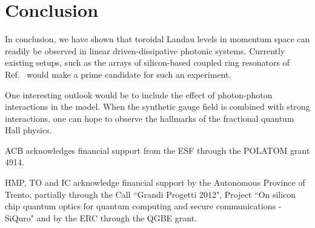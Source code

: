\documentclass[twocolumn, 10pt, aps, superscriptaddress, floatfix, showpacs, pra, citeautoscript]{revtex4-1}
\newcommand{\co}[2]{#2}
\renewcommand{\paragraph}{\co}
\begin{document}
\section{Conclusion}
\label{sec:conclusion}


In conclusion, we have shown that toroidal Landau levels in momentum
space can readily be observed in linear driven-dissipative photonic
systems. Currently existing setups, such as the arrays of
silicon-based coupled ring resonators of
Ref.~ would make a prime candidate for
such an experiment.

\paragraph{One possible outlook is to include interactions.}
One interesting outlook would be to include the effect of photon-photon interactions in the model. When the synthetic gauge field is combined with strong interactions, one can hope to observe the hallmarks of the fractional quantum Hall physics.


\acknowledgments

ACB acknowledges financial support from the ESF through the POLATOM grant 4914.

HMP, TO and IC acknowledge financial support by the Autonomous Province of Trento, partially through the Call ``Grandi Progetti 2012", Project ``On silicon chip quantum optics for quantum computing and secure communications - SiQuro" and by the ERC through the QGBE grant.



\end{document}
